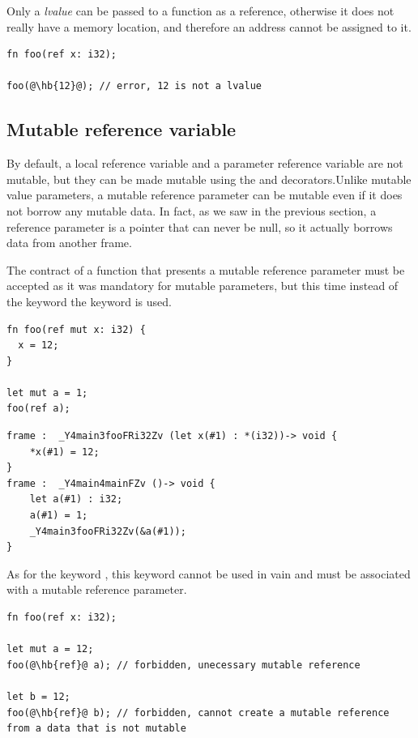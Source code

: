 Only a \textit{lvalue} can be passed to a function as a reference, otherwise it
does not really have a memory location, and therefore an address cannot be
assigned to it.

\begin{lstlisting}[style=coloredverbatimError, escapechar=@]
fn foo(ref x: i32);

foo(@\hb{12}@); // error, 12 is not a lvalue
\end{lstlisting}

\subsection{Mutable reference variable}
\label{sec:memory:mut_ref_param}

By default, a local reference variable and a parameter reference variable are
not mutable, but they can be made mutable using the  and 
decorators.Unlike mutable value parameters, a mutable reference parameter can be
mutable even if it does not borrow any mutable data. In fact, as we saw in the
previous section, a reference parameter is a pointer that can never be null, so
it actually borrows data from another frame.

The contract of a function that presents a mutable reference parameter must be
accepted as it was mandatory for mutable parameters, but this time instead of
the keyword  the keyword  is used.

\begin{lstlisting}[style=coloredverbatim]
fn foo(ref mut x: i32) {
  x = 12;
}

let mut a = 1;
foo(ref a);
\end{lstlisting}

\begin {lstlisting}[style=lyilVerb]
frame :  _Y4main3fooFRi32Zv (let x(#1) : *(i32))-> void {
    *x(#1) = 12;
}
frame :  _Y4main4mainFZv ()-> void {
    let a(#1) : i32;
    a(#1) = 1;
    _Y4main3fooFRi32Zv(&a(#1));
}
\end{lstlisting}

As for the keyword , this keyword  cannot be used in
vain and must be associated with a mutable reference parameter.

\begin{lstlisting}[style=coloredverbatimError, escapechar=@]
fn foo(ref x: i32);

let mut a = 12;
foo(@\hb{ref}@ a); // forbidden, unecessary mutable reference

let b = 12;
foo(@\hb{ref}@ b); // forbidden, cannot create a mutable reference from a data that is not mutable
\end{lstlisting}

